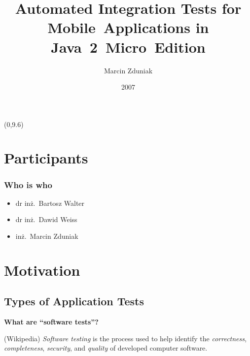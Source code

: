 \documentclass[compress]{beamer}
\title[Automated Integration Tests for Mobile~Applications in J2ME]%
{Automated Integration Tests for Mobile~Applications in Java~2~Micro~Edition}
\author{Marcin Zduniak}
\institute{Institute of Computing Science\\Poznan University of Technology}
\date{2007}
\begin{document}
\begin{frame}[plain]
    \titlepage

    \begin{textblock}{1}(0,9.6)
    \end{textblock}
\end{frame}

\section{Participants}  %

\begin{frame}
  \frametitle{Who is who}

  \begin{itemize}
      \item dr inż.~Bartosz Walter
      \item dr inż.~Dawid Weiss
      \item inż.~Marcin Zduniak
  \end{itemize}
\end{frame}

\section{Motivation} %

\subsection[Test types]{Types of Application Tests} %

\begin{frame}

    \begin{center}\Large\bfseries
    What are ``software tests''?
    \end{center}

    \pause\bigskip
	\begin{block}{(Wikipedia)}
        \emph{Software testing} is the process used to help identify the \emph{correctness}, 
        \emph{completeness}, \emph{security}, and \emph{quality} of developed computer software.
	\end{block}
\end{frame}
\end{document}
